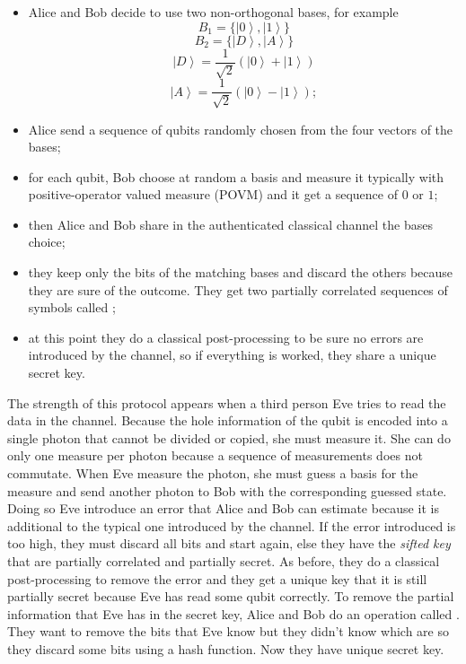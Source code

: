 \begin{itemize}
  \item Alice and Bob decide to use two non-orthogonal bases, for example
        \begin{equation}
          B_1 = \{\left|0\right>, \left|1\right>\}
        \end{equation}
        \begin{equation}
          B_2 = \{\left|D\right>, \left|A\right>\}
        \end{equation}
        \begin{equation}
          \left|D\right> = \frac{1}{\sqrt{2}} (\left|0\right> + \left|1\right>)
        \end{equation}
        \begin{equation}
          \left|A\right> = \frac{1}{\sqrt{2}} (\left|0\right> - \left|1\right>);
        \end{equation}
  \item Alice send a sequence of qubits randomly chosen from the four vectors of the bases;
  \item for each qubit, Bob choose at random a basis and measure it typically with positive-operator valued measure (POVM) and it get a sequence of $0$ or $1$;
  \item then Alice and Bob share in the authenticated classical channel the bases choice;
  \item they keep only the bits of the matching bases and discard the others because they are sure of the outcome. They get two partially correlated sequences of symbols called ;
  \item at this point they do a classical post-processing to be sure no errors are introduced by the channel, so if everything is worked, they share a unique secret key.
\end{itemize}

The strength of this protocol appears when a third person Eve tries to read the data in the channel. Because the hole information of the qubit is encoded into a single photon that cannot be divided or copied, she must measure it. She can do only one measure per photon because a sequence of measurements does not commutate. When Eve measure the photon, she must guess a basis for the measure and send another photon to Bob with the corresponding guessed state. Doing so Eve introduce an error that Alice and Bob can estimate because it is additional to the typical one introduced by the channel. If the error introduced is too high, they must discard all bits and start again, else they have the \textit{sifted key} that are partially correlated and partially secret. As before, they do a classical post-processing to remove the error and they get a unique key that it is still partially secret because Eve has read some qubit correctly. To remove the partial information that Eve has in the secret key, Alice and Bob do an operation called . They want to remove the bits that Eve know but they didn't know which are so they discard some bits using a hash function. Now they have unique secret key.


